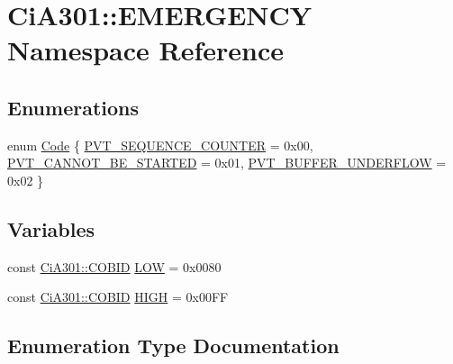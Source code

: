 \hypertarget{namespace_ci_a301_1_1_e_m_e_r_g_e_n_c_y}{}\section{Ci\+A301\+:\+:E\+M\+E\+R\+G\+E\+N\+C\+Y Namespace Reference}
\label{namespace_ci_a301_1_1_e_m_e_r_g_e_n_c_y}
\subsection*{Enumerations}
\begin{DoxyCompactItemize}
\item 
enum \hyperlink{namespace_ci_a301_1_1_e_m_e_r_g_e_n_c_y_a5b4233d92eee286424fe45b52afacc07}{Code} \{ \hyperlink{namespace_ci_a301_1_1_e_m_e_r_g_e_n_c_y_a5b4233d92eee286424fe45b52afacc07a28bb6722b9ae61878560a1ac3e575a68}{P\+V\+T\+\_\+\+S\+E\+Q\+U\+E\+N\+C\+E\+\_\+\+C\+O\+U\+N\+T\+E\+R} = 0x00, 
\hyperlink{namespace_ci_a301_1_1_e_m_e_r_g_e_n_c_y_a5b4233d92eee286424fe45b52afacc07a9d86b6c21a4899ab88021df322cd3786}{P\+V\+T\+\_\+\+C\+A\+N\+N\+O\+T\+\_\+\+B\+E\+\_\+\+S\+T\+A\+R\+T\+E\+D} = 0x01, 
\hyperlink{namespace_ci_a301_1_1_e_m_e_r_g_e_n_c_y_a5b4233d92eee286424fe45b52afacc07a1ece25e44a861df72fe9ea22e1b1e0a3}{P\+V\+T\+\_\+\+B\+U\+F\+F\+E\+R\+\_\+\+U\+N\+D\+E\+R\+F\+L\+O\+W} = 0x02
 \}
\end{DoxyCompactItemize}
\subsection*{Variables}
\begin{DoxyCompactItemize}
\item 
const \hyperlink{namespace_ci_a301_aec5b5dbb2b60d2837c60499f6f297aa7}{Ci\+A301\+::\+C\+O\+B\+I\+D} \hyperlink{namespace_ci_a301_1_1_e_m_e_r_g_e_n_c_y_afd634e483d0eedb29789234d50cb6895}{L\+O\+W} = 0x0080
\item 
const \hyperlink{namespace_ci_a301_aec5b5dbb2b60d2837c60499f6f297aa7}{Ci\+A301\+::\+C\+O\+B\+I\+D} \hyperlink{namespace_ci_a301_1_1_e_m_e_r_g_e_n_c_y_a86da6584e2722e7e1b2c0fc763c06754}{H\+I\+G\+H} = 0x00\+F\+F
\end{DoxyCompactItemize}


\subsection{Enumeration Type Documentation}
\hypertarget{namespace_ci_a301_1_1_e_m_e_r_g_e_n_c_y_a5b4233d92eee286424fe45b52afacc07}{}
